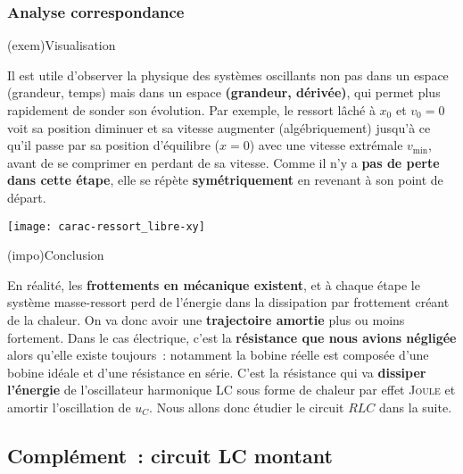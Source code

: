 \documentclass[../../main/main.tex]{subfiles}
\begin{document}
\vspace*{-20pt}
\subsubsection{Analyse correspondance}
\begin{tcb}[width=\linewidth, sidebyside, righthand ratio=.4, hand](exem){Visualisation}

	Il est utile d'observer la physique des systèmes oscillants non pas dans
	un espace (grandeur, temps) mais dans un espace \textbf{(grandeur,
		dérivée)}, qui permet plus rapidement de sonder son évolution. Par
	exemple, le ressort lâché à $x_0$ et $v_0=0$ voit sa position diminuer
	et sa vitesse augmenter (algébriquement) jusqu'à ce qu'il passe par sa
	position d'équilibre ($x=0$) avec une vitesse extrémale $v_{\min}$,
	avant de se comprimer en perdant de sa vitesse. Comme il n'y a
	\textbf{pas de perte dans cette étape}, elle se répète
	\textbf{symétriquement} en revenant à son point de départ.

	\tcblower
	\begin{center}
		\texttt{[image: carac-ressort\_libre-xy]}
	\end{center}
\end{tcb}

\begin{tcb}[label=impo:harmotoamorti](impo){Conclusion}

	En réalité, les \textbf{frottements en mécanique existent}, et à chaque
	étape le système masse-ressort perd de l'énergie dans la dissipation par
	frottement créant de la chaleur. On va donc avoir une \textbf{trajectoire
		amortie} plus ou moins fortement. Dans le cas électrique, c'est la
	\textbf{résistance que nous avions négligée} alors qu'elle existe toujours~:
	notamment la bobine réelle est composée d'une bobine idéale et d'une
	résistance en série. C'est la résistance qui va \textbf{dissiper l'énergie}
	de l'oscillateur harmonique LC sous forme de chaleur par effet
	\textsc{Joule} et amortir l'oscillation de $u_C$. Nous allons donc étudier
	le circuit $RLC$ dans la suite.
\end{tcb}

\subsection{Complément~: circuit LC montant}
\end{document}
